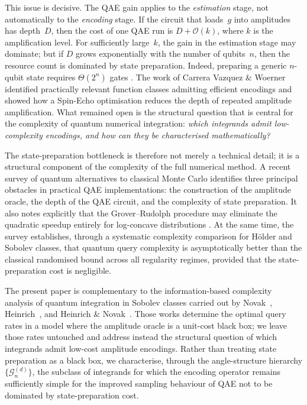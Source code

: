 \documentclass[12pt,a4paper]{article}
\theoremstyle{plain}
\theoremstyle{definition}
\theoremstyle{remark}
\begin{document}
This issue is decisive.
The QAE gain applies to the \emph{estimation} stage, not
automatically to the \emph{encoding} stage.
If the circuit that loads~$g$ into amplitudes has depth~$D$, then the
cost of one QAE run is $D + \mathcal{O}(k)$, where $k$ is the
amplification level.
For sufficiently large~$k$, the gain in the estimation stage may
dominate; but if $D$ grows exponentially with the number of qubits~$n$,
then the resource count is dominated by state preparation.
Indeed, preparing a generic $n$-qubit state requires $\Theta(2^n)$
gates \cite{ShendeBullockMarkov2006,BarencoEtAl1995}.
The work of Carrera Vazquez \& Woerner
\cite{CarreraVazquezWoerner2020} identified practically relevant
function classes admitting efficient encodings and showed how a
Spin-Echo optimisation reduces the depth of repeated amplitude
amplification.
What remained open is the structural question that is central for the
complexity of quantum numerical integration:
\emph{which integrands admit low-complexity encodings, and how can they be
characterised mathematically?}

The state-preparation bottleneck is therefore not merely a technical
detail; it is a structural component of the complexity of the full
numerical method.
A recent survey of quantum alternatives to classical Monte Carlo
\cite{IntalluraKorpas2026} identifies three principal obstacles in
practical QAE implementations: the construction of the amplitude oracle,
the depth of the QAE circuit, and the complexity of state preparation.
It also notes explicitly that the Grover--Rudolph procedure
\cite{GroverRudolph2002} may eliminate the quadratic speedup entirely
for log-concave distributions \cite{Herbert2021}.
At the same time, the survey establishes, through a systematic complexity
comparison for H\"older and Sobolev classes, that quantum query
complexity is asymptotically better than the classical randomised bound
across all regularity regimes, provided that the state-preparation cost
is negligible.


The present paper is complementary to the information-based complexity
analysis of quantum integration in Sobolev classes carried out by
Novak~\cite{Novak2001}, Heinrich~\cite{Heinrich2003}, and
Heinrich \& Novak~\cite{HeinrichNovak2003}.
Those works determine the optimal query rates in a model where the
amplitude oracle is a unit-cost black box; we leave those rates
untouched and address instead the structural question of which
integrands admit low-cost amplitude encodings.
Rather than treating state preparation as a black box, we characterise,
through the angle-structure hierarchy $\{\mathcal{G}_n^{(d)}\}$, the
subclass of integrands for which the encoding operator remains sufficiently simple
for the improved sampling behaviour of QAE not to be dominated by
state-preparation cost.
\end{document}
